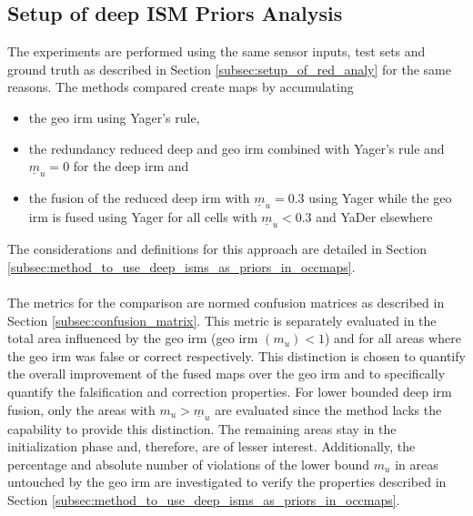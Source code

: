 \subsection{Setup of deep ISM Priors Analysis}
\label{subsec:setup_of_prior_analy}
The experiments are performed using the same sensor inputs, test sets and ground truth as described in Section \ref{subsec:setup_of_red_analy} for the same reasons. The methods compared create maps by accumulating
\begin{itemize}[noitemsep,nolistsep]
	\item the geo \gls{irm} using Yager's rule,
	\item the redundancy reduced deep and geo \gls{irm} combined with Yager's rule and $\underline{m}_u = 0$ for the deep \gls{irm} and
	\item the fusion of the reduced deep \gls{irm} with $\underline{m}_u = 0.3$ using Yager while the geo \gls{irm} is fused using Yager for all cells with $\underline{m}_u < 0.3$ and YaDer elsewhere
\end{itemize}
The considerations and definitions for this approach are detailed in Section \ref{subsec:method_to_use_deep_isms_as_priors_in_occmaps}. 
\\\\
The metrics for the comparison are normed confusion matrices as described in Section \ref{subsec:confusion_matrix}. This metric is separately evaluated in the total area influenced by the geo \gls{irm} (geo \gls{irm} $(m_u) < 1$) and for all areas where the geo \gls{irm} was false or correct respectively. This distinction is chosen to quantify the overall improvement of the fused maps over the geo \gls{irm} and to specifically quantify the falsification and correction properties. For lower bounded deep \gls{irm} fusion, only the areas with $m_u > \underline{m}_u$ are evaluated since the method lacks the capability to provide this distinction. The remaining areas stay in the initialization phase and, therefore, are of lesser interest. Additionally, the percentage and absolute number of violations of the lower bound $m_u$ in areas untouched by the geo \gls{irm} are investigated to verify the properties described in Section \ref{subsec:method_to_use_deep_isms_as_priors_in_occmaps}.
%
